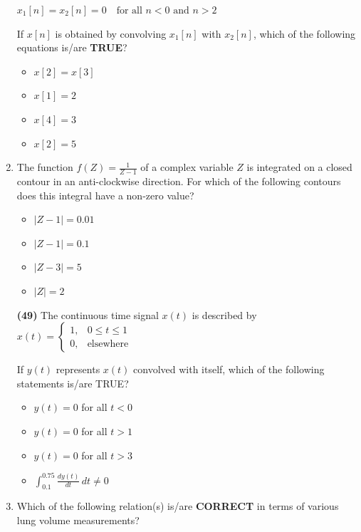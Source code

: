 \documentclass[journal]{IEEEtran}
\begin{document}
\begin{enumerate}
$
x_1[n] = x_2[n] = 0 \quad \text{for all } n < 0 \text{ and } n > 2
$

If \( x[n] \) is obtained by convolving \( x_1[n] \) with \( x_2[n] \), which of the following equations is/are \textbf{TRUE}?

\bigskip

\begin{itemize}
    \item \( x[2] = x[3] \)
    \item \( x[1] = 2 \)
    \item \( x[4] = 3 \)
    \item \( x[2] = 5 \)
\end{itemize}
\hfill{}

\item 
The function 
$
f(Z) = \frac{1}{Z - 1}
$
of a complex variable \( Z \) is integrated on a closed contour in an anti-clockwise direction. For which of the following contours does this integral have a non-zero value?



\begin{itemize}
    \item \( |Z - 1| = 0.01 \)
    \item \( |Z - 1| = 0.1 \)
    \item \( |Z - 3| = 5 \)
    \item \( |Z| = 2 \)
\end{itemize}
\hfill{}

\textbf{(49)}
The continuous time signal \( x(t) \) is described by
$
x(t) = 
\begin{cases}
1, & 0 \le t \le 1 \\
0, & \text{elsewhere}
\end{cases}
$

If \( y(t) \) represents \( x(t) \) convolved with itself, which of the following statements is/are TRUE?

\begin{itemize}
    \item \( y(t) = 0 \) for all \( t < 0 \)
    \item \( y(t) = 0 \) for all \( t > 1 \)
    \item \( y(t) = 0 \) for all \( t > 3 \)
    \item \( \displaystyle \int_{0.1}^{0.75} \frac{dy(t)}{dt} \, dt \ne 0 \)
\end{itemize}
\hfill{}

\item 
Which of the following relation(s) is/are \textbf{CORRECT} in terms of various lung volume measurements?


\end{enumerate}
\end{document}
